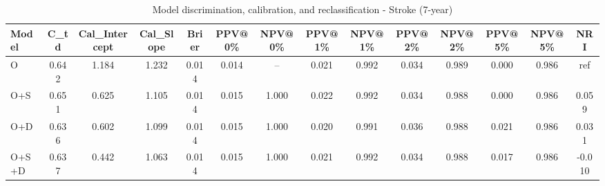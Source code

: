 \begin{table}[htbp]
\centering
\small
\caption{Model discrimination, calibration, and reclassification - Stroke (7-year)}
\label{tab:perf_stroke_7y}
\begin{tabular}{lccccccccccccc}
\toprule
Model & C\_td & Cal\_Intercept & Cal\_Slope & Brier & PPV@0\% & NPV@0\% & PPV@1\% & NPV@1\% & PPV@2\% & NPV@2\% & PPV@5\% & NPV@5\% & NRI \\
\midrule
O & 0.642 & 1.184 & 1.232 & 0.014 & 0.014 & -- & 0.021 & 0.992 & 0.034 & 0.989 & 0.000 & 0.986 & ref \\
O+S & 0.651 & 0.625 & 1.105 & 0.014 & 0.015 & 1.000 & 0.022 & 0.992 & 0.034 & 0.988 & 0.000 & 0.986 & 0.059 \\
O+D & 0.636 & 0.602 & 1.099 & 0.014 & 0.015 & 1.000 & 0.020 & 0.991 & 0.036 & 0.988 & 0.021 & 0.986 & 0.031 \\
O+S+D & 0.637 & 0.442 & 1.063 & 0.014 & 0.015 & 1.000 & 0.021 & 0.992 & 0.034 & 0.988 & 0.017 & 0.986 & -0.010 \\
\bottomrule
\end{tabular}
\end{table}